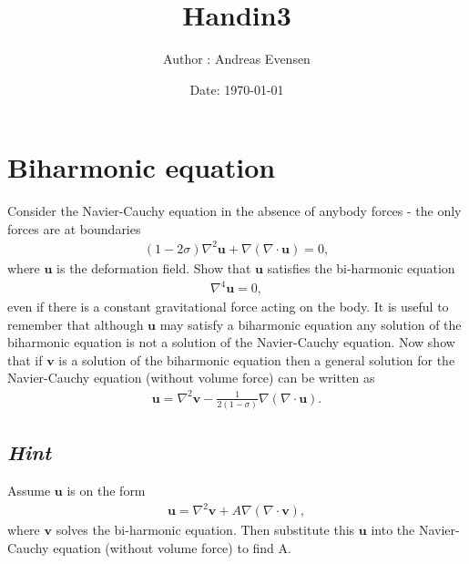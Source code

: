 \documentclass{article}
\title{Handin3}
\author{Author : Andreas Evensen}
\date{Date: \today}
\newcommand{\laplace}{\nabla^2}
\begin{document}
\maketitle
\section{Biharmonic equation}
Consider the Navier-Cauchy equation in the absence of anybody forces - the only forces are at boundaries
\begin{align*}
    (1-2\sigma)\laplace\mathbf{u} + \nabla\left(\nabla\cdot \mathbf{u}\right) = 0,
\end{align*}where $\mathbf{u}$ is the deformation field. Show that $\mathbf{u}$ satisfies the bi-harmonic equation
\begin{align*}
    \nabla^4\mathbf{u} = 0,
\end{align*}even if there is a constant gravitational force acting on the body. It is useful to remember that although
$\mathbf{u}$ may satisfy a biharmonic equation any solution of the biharmonic equation is not a solution of the Navier-Cauchy equation.
Now show that if $\mathbf{v}$ is a solution of the biharmonic equation then a general solution for the Navier-Cauchy equation (without volume force) can be written as
\begin{align*}
    \mathbf{u} = \laplace\mathbf{v} -\frac{1}{2(1-\sigma)}\nabla\left(\nabla\cdot\mathbf{u}\right).
\end{align*}
\subsection*{\textit{Hint}}
Assume $\mathbf{u}$ is on the form
\begin{align*}
    \mathbf{u} = \laplace\mathbf{v}+ A\nabla\left(\nabla\cdot\mathbf{v}\right),
\end{align*}where $\mathbf{v}$ solves the bi-harmonic equation. Then substitute this $\mathbf{u}$ into the Navier-Cauchy equation (without volume force) to find A.
\end{document}
